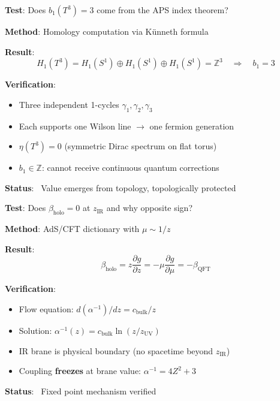 \documentclass[12pt,a4paper]{article}
\newcommand{\Tthree}{T^3}
\newcommand{\Zsq}{Z^2}
\begin{document}
\begin{tcolorbox}[colback=blue!5!white, colframe=blue!60!black, title=Audit 2: Topological Boundary (+3)]
\textbf{Test}: Does $b_1(\Tthree) = 3$ come from the APS index theorem?

\textbf{Method}: Homology computation via K\"unneth formula

\textbf{Result}:
\begin{equation}
H_1(\Tthree) = H_1(S^1) \oplus H_1(S^1) \oplus H_1(S^1) = \mathbb{Z}^3 \quad \Rightarrow \quad b_1 = 3
\end{equation}

\textbf{Verification}:
\begin{itemize}[itemsep=0pt]
    \item Three independent 1-cycles $\gamma_1, \gamma_2, \gamma_3$
    \item Each supports one Wilson line $\to$ one fermion generation
    \item $\eta(\Tthree) = 0$ (symmetric Dirac spectrum on flat torus)
    \item $b_1 \in \mathbb{Z}$: cannot receive continuous quantum corrections
\end{itemize}
\textbf{Status}: \checkmark\ Value emerges from topology, topologically protected
\end{tcolorbox}

\begin{tcolorbox}[colback=blue!5!white, colframe=blue!60!black, title=Audit 3: Holographic Flow (IR Lock)]
\textbf{Test}: Does $\beta_{\text{holo}} = 0$ at $z_{\text{IR}}$ and why opposite sign?

\textbf{Method}: AdS/CFT dictionary with $\mu \sim 1/z$

\textbf{Result}:
\begin{equation}
\beta_{\text{holo}} = z\frac{\partial g}{\partial z} = -\mu\frac{\partial g}{\partial \mu} = -\beta_{\text{QFT}}
\end{equation}

\textbf{Verification}:
\begin{itemize}[itemsep=0pt]
    \item Flow equation: $d(\alpha^{-1})/dz = c_{\text{bulk}}/z$
    \item Solution: $\alpha^{-1}(z) = c_{\text{bulk}} \ln(z/z_{\text{UV}})$
    \item IR brane is physical boundary (no spacetime beyond $z_{\text{IR}}$)
    \item Coupling \textbf{freezes} at brane value: $\alpha^{-1} = 4\Zsq + 3$
\end{itemize}
\textbf{Status}: \checkmark\ Fixed point mechanism verified
\end{tcolorbox}
\end{document}
